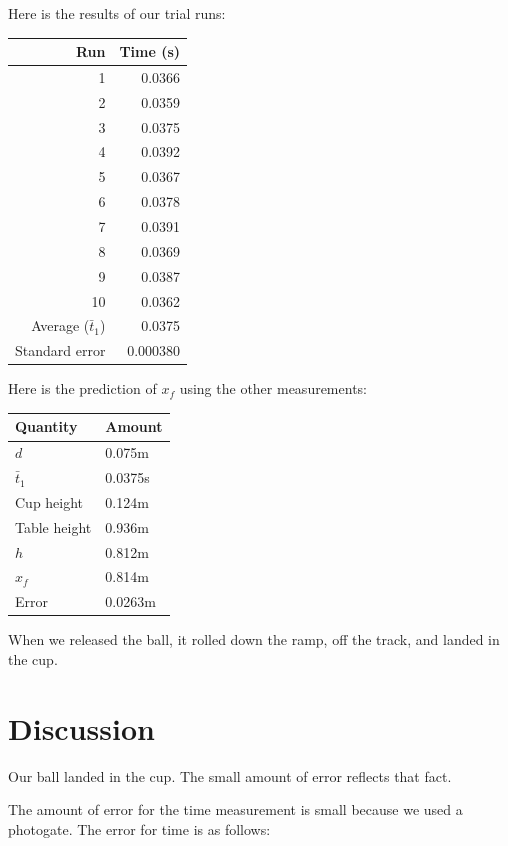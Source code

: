 \documentclass[12pt]{article}
\begin{document}
Here is the results of our trial runs:
\begin{center}
\begin{tabular}{r|r}
\hline
Run & Time (s)\\
\hline
1 & 0.0366\\
2 & 0.0359\\
3 & 0.0375\\
4 & 0.0392\\
5 & 0.0367\\
6 & 0.0378\\
7 & 0.0391\\
8 & 0.0369\\
9 & 0.0387\\
10 & 0.0362\\
\hline
Average (\(\bar{t}_{1}\)) & 0.0375\\
Standard error & 0.000380\\
\end{tabular}
\end{center}

Here is the prediction of \(x_f\) using the other measurements:

\begin{center}
\begin{tabular}{l|l}
\hline
Quantity & Amount\\
\hline
\(d\) & 0.075m\\
\(\bar{t}_{1}\) & 0.0375s\\
Cup height & 0.124m\\
Table height & 0.936m\\
\(h\) & 0.812m\\
\(x_f\) & 0.814m\\
Error & 0.0263m\\
\end{tabular}
\end{center}

When we released the ball, it rolled down the ramp, off the track, and landed in the cup.
\section{Discussion}
\label{sec:org4144e5e}

Our ball landed in the cup. The small amount of error reflects that fact.

The amount of error for the time measurement is small because we used a photogate. The error for time is as follows:
\end{document}
